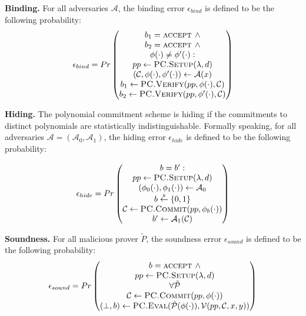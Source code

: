 \textbf{Binding.} For all adversaries $\mathcal{A}$, the binding error $\epsilon_{bind}$ is defined to be the following probability:
$$
\epsilon_{bind} = Pr
\begin{pmatrix}
 b_1 = \textsc{accept } \wedge \\
 b_2 = \textsc{accept } \wedge \\
 \phi(\cdot) \neq \phi^\prime(\cdot): \\
 pp \leftarrow \textsc{PC.Setup}(\lambda, d) \\
 (\mathcal{C}, \phi(\cdot), \phi^\prime(\cdot)) \leftarrow \mathcal{A}(x) \\
 b_1 \leftarrow \textsc{PC.Verify}(pp, \phi(\cdot), \mathcal{C}) \\
 b_2 \leftarrow \textsc{PC.Verify}(pp, \phi^\prime(\cdot), \mathcal{C})
\end{pmatrix}
$$



\textbf{Hiding.} The polynomial commitment scheme is hiding if the commitments to distinct polynomials are statistically indistinguishable. Formally speaking, for all adversaries $\mathcal{A} = (\mathcal{A}_0, \mathcal{A}_1)$, the hiding error $\epsilon_{hide}$ is defined to be the following probability:

$$
\epsilon_{hide} = Pr
\begin{pmatrix}
 b = b^\prime : \\
 pp \leftarrow \textsc{PC.Setup}(\lambda, d) \\
 (\phi_0(\cdot), \phi_1(\cdot)) \leftarrow \mathcal{A}_0 \\
 b \overset{{\scriptscriptstyle\$}}{\leftarrow} \{0, 1\} \\
 \mathcal{C} \leftarrow \textsc{PC.Commit}(pp, \phi_b(\cdot)) \\
 b^\prime \leftarrow \mathcal{A}_1(\mathcal{C})
\end{pmatrix}
$$


\textbf{Soundness.} For all malicious prover $\tilde{P}$, the soundness error $\epsilon_{sound}$ is defined to be the following probability:
$$
\epsilon_{sound} = Pr
\begin{pmatrix}
 b = \textsc{accept } \wedge \\
 pp \leftarrow \textsc{PC.Setup}(\lambda, d) \\
 \forall \tilde{\mathcal{P}} \\
 \mathcal{C} \leftarrow \textsc{PC.Commit}(pp, \phi(\cdot)) \\
 (\perp, b)\leftarrow \textsc{PC.Eval}(\tilde{\mathcal{P}}(\phi(\cdot)), \mathcal{V}(pp, \mathcal{C}, x, y))
\end{pmatrix}
$$



